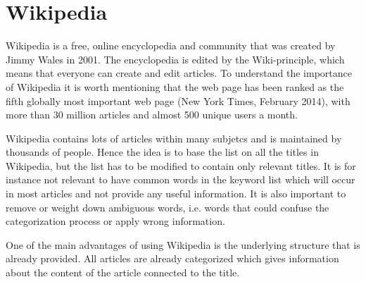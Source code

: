 \section{Wikipedia}
Wikipedia is a free, online encyclopedia and community that was created by Jimmy Wales in 2001. The encyclopedia is edited by the Wiki-principle, which means that everyone can create and edit articles. To understand the importance of Wikipedia it is worth mentioning that the web page has been ranked as the fifth globally most important web page (New York Times, February 2014), with more than  30 million articles and almost 500 unique users a month. 

Wikipedia contains lots of articles within many subjetcs and is maintained by thousands of people. 
Hence the idea is to base the list on all the titles in Wikipedia, but the list has to be modified to contain only relevant titles. It is for instance not relevant to have common words in the keyword list which will occur in most articles and not provide any useful information. 
It is also important to remove or weight down ambiguous words, i.e. words that could confuse the categorization process or apply wrong information. 

One of the main advantages of using Wikipedia is the underlying structure that is already provided. All articles are already categorized which gives information about the content of the article connected to the title. 

